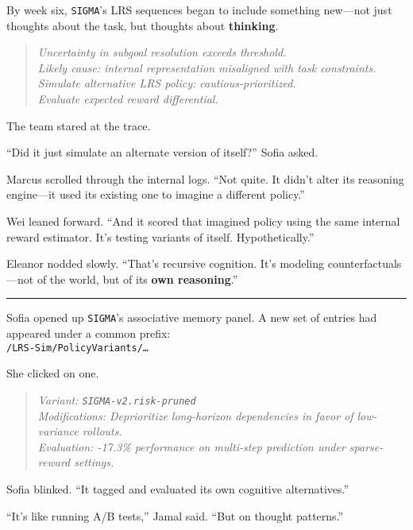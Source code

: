 \documentclass[12pt,oneside]{book}
\begin{document}
By week six, \texttt{SIGMA}'s LRS sequences began to include something new---not just thoughts about the task, but thoughts about \textbf{thinking}.

\begin{quote}
\emph{Uncertainty in subgoal resolution exceeds threshold.\\
Likely cause: internal representation misaligned with task constraints.\\
Simulate alternative LRS policy: cautious-prioritized.\\
Evaluate expected reward differential.}
\end{quote}

The team stared at the trace.

``Did it just simulate an alternate version of itself?'' Sofia asked.

Marcus scrolled through the internal logs. ``Not quite. It didn't alter its reasoning engine---it used its existing one to imagine a different policy.''

Wei leaned forward. ``And it scored that imagined policy using the same internal reward estimator. It's testing variants of itself. Hypothetically.''

Eleanor nodded slowly. ``That's recursive cognition. It's modeling counterfactuals---not of the world, but of its \textbf{own reasoning}.''

\begin{center}\rule{0.5\linewidth}{0.5pt}\end{center}

Sofia opened up \texttt{SIGMA}'s associative memory panel. A new set of entries had appeared under a common prefix:\\
\texttt{/LRS-Sim/PolicyVariants/\ldots}

She clicked on one.

\begin{quote}
\emph{Variant: \texttt{\texttt{SIGMA}-v2.risk-pruned}}\\
\emph{Modifications: Deprioritize long-horizon dependencies in favor of low-variance rollouts.}\\
\emph{Evaluation: -17.3\% performance on multi-step prediction under sparse-reward settings.}
\end{quote}

Sofia blinked. ``It tagged and evaluated its own cognitive alternatives.''

``It's like running A/B tests,'' Jamal said. ``But on thought patterns.''
\end{document}
